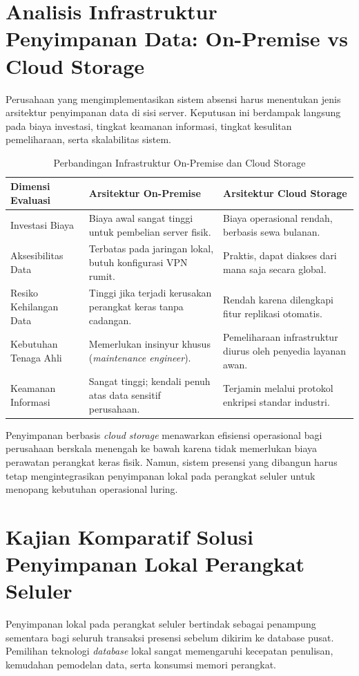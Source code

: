 \section{Analisis Infrastruktur Penyimpanan Data: On-Premise vs Cloud Storage}
Perusahaan yang mengimplementasikan sistem absensi harus menentukan jenis arsitektur penyimpanan data di sisi server. Keputusan ini berdampak langsung pada biaya investasi, tingkat keamanan informasi, tingkat kesulitan pemeliharaan, serta skalabilitas sistem.

\begin{table}[ht]
\centering
\caption{Perbandingan Infrastruktur On-Premise dan Cloud Storage}
\label{tab:perbandingan_infrastruktur}
\begin{tabular}{|p{3cm}|p{5cm}|p{5cm}|}
\hline
\textbf{Dimensi Evaluasi} & \textbf{Arsitektur On-Premise} & \textbf{Arsitektur Cloud Storage} \\ \hline
Investasi Biaya & Biaya awal sangat tinggi untuk pembelian server fisik. & Biaya operasional rendah, berbasis sewa bulanan. \\ \hline
Aksesibilitas Data & Terbatas pada jaringan lokal, butuh konfigurasi VPN rumit. & Praktis, dapat diakses dari mana saja secara global. \\ \hline
Resiko Kehilangan Data & Tinggi jika terjadi kerusakan perangkat keras tanpa cadangan. & Rendah karena dilengkapi fitur replikasi otomatis. \\ \hline
Kebutuhan Tenaga Ahli & Memerlukan insinyur khusus (\textit{maintenance engineer}). & Pemeliharaan infrastruktur diurus oleh penyedia layanan awan. \\ \hline
Keamanan Informasi & Sangat tinggi; kendali penuh atas data sensitif perusahaan. & Terjamin melalui protokol enkripsi standar industri. \\ \hline
\end{tabular}
\end{table}

Penyimpanan berbasis \textit{cloud storage} menawarkan efisiensi operasional bagi perusahaan berskala menengah ke bawah karena tidak memerlukan biaya perawatan perangkat keras fisik. Namun, sistem presensi yang dibangun harus tetap mengintegrasikan penyimpanan lokal pada perangkat seluler untuk menopang kebutuhan operasional luring.

\section{Kajian Komparatif Solusi Penyimpanan Lokal Perangkat Seluler}
Penyimpanan lokal pada perangkat seluler bertindak sebagai penampung sementara bagi seluruh transaksi presensi sebelum dikirim ke database pusat. Pemilihan teknologi \textit{database} lokal sangat memengaruhi kecepatan penulisan, kemudahan pemodelan data, serta konsumsi memori perangkat.

